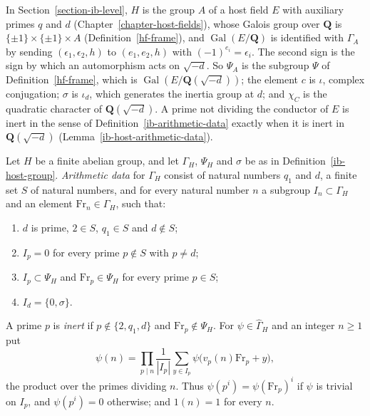 \begin{remark}\label{ib-host-group-fields}
In Section~\ref{section-ib-level}, $H$ is the group $A$ of a host field $E$ with
auxiliary primes $q$ and $d$ (Chapter~\ref{chapter-host-fields}), whose Galois
group over $\mathbf Q$ is $\{\pm1\}\times\{\pm1\}\times A$
(Definition~\ref{hf-frame}), and $\operatorname{Gal}(E/\mathbf Q)$ is
identified with $\Gamma_A$ by sending $(\epsilon_1,\epsilon_2,h)$ to
$(e_1,e_2,h)$ with $(-1)^{e_i}=\epsilon_i$. The second sign is the sign by which
an automorphism acts on $\sqrt{-d}$. So $\Psi_A$ is the subgroup $\Psi$ of
Definition~\ref{hf-frame}, which is $\operatorname{Gal}(E/\mathbf Q(\sqrt{-d}))$;
the element $c$ is $\iota$, complex conjugation; $\sigma$ is $\iota_d$, which
generates the inertia group at $d$; and $\chi_C$ is the quadratic character of
$\mathbf Q(\sqrt{-d})$. A prime not dividing the
conductor of $E$ is inert in the sense of Definition~\ref{ib-arithmetic-data}
exactly when it is inert in $\mathbf Q(\sqrt{-d})$
(Lemma~\ref{ib-host-arithmetic-data}).
\end{remark}

\begin{definition}\label{ib-arithmetic-data}
Let $H$ be a finite abelian group, and let $\Gamma_H$, $\Psi_H$ and $\sigma$ be
as in Definition~\ref{ib-host-group}. \emph{Arithmetic data} for $\Gamma_H$
consist of natural numbers $q_1$ and $d$, a finite set $S$ of natural numbers,
and for every natural number $n$ a subgroup $I_n\subset\Gamma_H$ and an element
$\mathrm{Fr}_n\in\Gamma_H$, such that:
\begin{enumerate}
\item $d$ is prime, $2\in S$, $q_1\in S$ and $d\notin S$;
\item $I_p=0$ for every prime $p\notin S$ with $p\neq d$;
\item $I_p\subset\Psi_H$ and $\mathrm{Fr}_p\in\Psi_H$ for every prime $p\in S$;
\item $I_d=\{0,\sigma\}$.
\end{enumerate}
A prime $p$ is \emph{inert} if $p\notin\{2,q_1,d\}$ and
$\mathrm{Fr}_p\notin\Psi_H$. For $\psi\in\widehat\Gamma_H$ and an integer
$n\geq1$ put
\[
 \psi(n)=\prod_{p\mid n}\frac1{|I_p|}\sum_{y\in I_p}
 \psi\bigl(v_p(n)\mathrm{Fr}_p+y\bigr),
\]
the product over the primes dividing $n$. Thus $\psi(p^i)=\psi(\mathrm{Fr}_p)^i$
if $\psi$ is trivial on $I_p$, and $\psi(p^i)=0$ otherwise; and $1(n)=1$ for
every $n$.
\end{definition}

